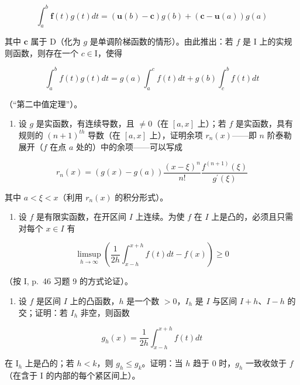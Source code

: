 \[
\int_ {a} ^ {b} \mathbf {f} (t) g (t) d t = (\mathbf {u} (b) - \mathbf {c}) g (b) + (\mathbf {c} - \mathbf {u} (a)) g (a)
\]

其中 \(\mathbf{c}\) 属于 D（化为 \(g\) 是单调阶梯函数的情形）。由此推出：若 \(f\) 是 I 上的实规则函数，则存在一个 \(c \in \mathrm{I}\)，使得

\[
\int_ {a} ^ {b} f (t) g (t) d t = g (a) \int_ {a} ^ {c} f (t) d t + g (b) \int_ {c} ^ {b} f (t) d t
\]

（“第二中值定理”）。

\begin{enumerate}
\def\labelenumi{\arabic{enumi})}
\setcounter{enumi}{16}
\tightlist
\item
  设 \(g\) 是实函数，有连续导数，且 \(\neq 0\)（在 \([a, x]\) 上）；若 \(f\) 是实函数，具有规则的 \((n + 1)^{th}\) 导数（在 \([a, x]\) 上），证明余项 \(r_n(x)\)——即 \(n\) 阶泰勒展开（\(f\) 在点 \(a\) 处的）中的余项——可以写成
\end{enumerate}

\[
r _ {n} (x) = (g (x) - g (a)) \frac {(x - \xi) ^ {n}}{n !} \frac {f ^ {(n + 1)} (\xi)}{g ^ {\prime} (\xi)}
\]

其中 \(a < \xi < x\)（利用 \(r_{n}(x)\) 的积分形式）。

\begin{enumerate}
\def\labelenumi{\arabic{enumi})}
\setcounter{enumi}{17}
\tightlist
\item
  设 \(f\) 是有限实函数，在开区间 \(I\) 上连续。为使 \(f\) 在 \(I\) 上是凸的，必须且只需对每个 \(x \in I\) 有
\end{enumerate}

\[
\operatorname * {l i m s u p} _ {h \to \infty} \left(\frac {1}{2 h} \int_ {x - h} ^ {x + h} f (t) d t - f (x)\right) \geqslant 0
\]

（按 I, p.~46 习题 9 的方式论证）。

\begin{enumerate}
\def\labelenumi{\arabic{enumi})}
\setcounter{enumi}{18}
\tightlist
\item
  设 \(f\) 是区间 \(I\) 上的凸函数，\(h\) 是一个数 \(> 0\)，\(I_h\) 是 \(I\) 与区间 \(I + h\)、\(I - h\) 的交；证明：若 \(I_h\) 非空，则函数
\end{enumerate}

\[
g _ {h} (x) = \frac {1}{2 h} \int_ {x - h} ^ {x + h} f (t) d t
\]

在 \(\mathrm{I}_h\) 上是凸的；若 \(h < k\)，则 \(g_h \leqslant g_k\)。证明：当 \(h\) 趋于 0 时，\(g_h\) 一致收敛于 \(f\)（在含于 \(\mathrm{I}\) 的内部的每个紧区间上）。

